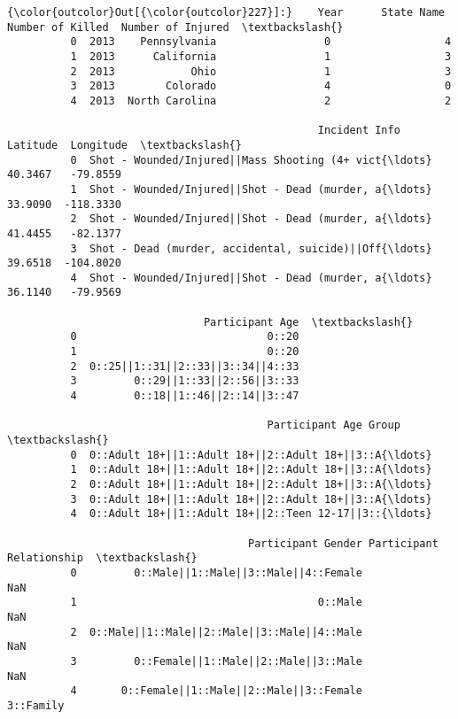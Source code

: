 \documentclass[11pt]{article}
\begin{document}
\begin{Verbatim}[commandchars=\\\{\}]
{\color{outcolor}Out[{\color{outcolor}227}]:}    Year      State Name  Number of Killed  Number of Injured  \textbackslash{}
          0  2013    Pennsylvania                 0                  4   
          1  2013      California                 1                  3   
          2  2013            Ohio                 1                  3   
          3  2013        Colorado                 4                  0   
          4  2013  North Carolina                 2                  2   
          
                                                 Incident Info  Latitude  Longitude  \textbackslash{}
          0  Shot - Wounded/Injured||Mass Shooting (4+ vict{\ldots}   40.3467   -79.8559   
          1  Shot - Wounded/Injured||Shot - Dead (murder, a{\ldots}   33.9090  -118.3330   
          2  Shot - Wounded/Injured||Shot - Dead (murder, a{\ldots}   41.4455   -82.1377   
          3  Shot - Dead (murder, accidental, suicide)||Off{\ldots}   39.6518  -104.8020   
          4  Shot - Wounded/Injured||Shot - Dead (murder, a{\ldots}   36.1140   -79.9569   
          
                               Participant Age  \textbackslash{}
          0                              0::20   
          1                              0::20   
          2  0::25||1::31||2::33||3::34||4::33   
          3         0::29||1::33||2::56||3::33   
          4         0::18||1::46||2::14||3::47   
          
                                         Participant Age Group  \textbackslash{}
          0  0::Adult 18+||1::Adult 18+||2::Adult 18+||3::A{\ldots}   
          1  0::Adult 18+||1::Adult 18+||2::Adult 18+||3::A{\ldots}   
          2  0::Adult 18+||1::Adult 18+||2::Adult 18+||3::A{\ldots}   
          3  0::Adult 18+||1::Adult 18+||2::Adult 18+||3::A{\ldots}   
          4  0::Adult 18+||1::Adult 18+||2::Teen 12-17||3::{\ldots}   
          
                                      Participant Gender Participant Relationship  \textbackslash{}
          0         0::Male||1::Male||3::Male||4::Female                      NaN   
          1                                      0::Male                      NaN   
          2  0::Male||1::Male||2::Male||3::Male||4::Male                      NaN   
          3         0::Female||1::Male||2::Male||3::Male                      NaN   
          4       0::Female||1::Male||2::Male||3::Female                3::Family   
          

\end{Verbatim}
\end{document}
